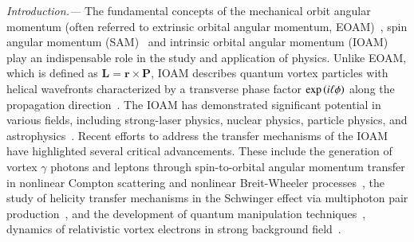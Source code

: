 \documentclass[prl,twocolumn,floatfix,amsmath,nofootinbib,superscriptaddress,amssymb,preprintnumbers,floatfix]{revtex4-1}
\begin{document}
\emph{Introduction.---} The fundamental concepts of the mechanical orbit angular momentum (often referred to extrinsic orbital angular momentum, EOAM)~\cite{newton1687}, spin angular momentum (SAM)~\cite{uhlenbeck1925} and  intrinsic orbital angular momentum (IOAM)~\cite{Allen:1992zz} play an indispensable role in the study and application of physics. Unlike EOAM, which is defined as $\mathbf{L}=\mathbf{r} \times \mathbf{P}$, IOAM describes quantum vortex particles with helical wavefronts characterized by a transverse phase factor ${\rm exp}\left(i\ell \phi\right)$ along the propagation direction~\cite{Jentschura:2010ap,PhysRevLett.107.174802,Bliokh:2015yhi,Padgett:17}. The IOAM has demonstrated significant potential in various fields, including strong-laser physics, nuclear physics, particle physics, and astrophysics~\cite{Bliokh:2017uvr,Ivanov:2022jzh,Session:2023hoq}. Recent efforts to address the transfer mechanisms of the IOAM have highlighted several critical advancements. These include the generation of vortex $\gamma$ photons and leptons through spin-to-orbital angular momentum transfer in nonlinear Compton scattering and nonlinear Breit-Wheeler processes~\cite{Ababekri:2022mob,Ababekri:2024cyd}, the study of helicity transfer mechanisms in the Schwinger effect via multiphoton pair production~\cite{Kohlfurst:2022edl}, and the development of quantum manipulation techniques~\cite{Lu:2023wrf,Jiang:2024fit}, dynamics of relativistic vortex electrons in strong background field~\cite{Ababekri:2024glc}. 
\end{document}
